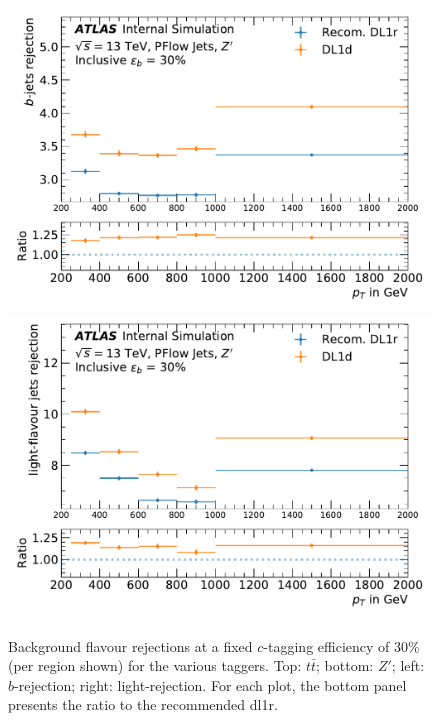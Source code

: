\begin{center}
\begin{figure}[h!]
\centerline{
\includegraphics[scale=0.425]{Images//FTAG/Reprocessed/plotting_eff_vs_pt_c/pT_vs_beff_c_zp_299.pdf}
\includegraphics[scale=0.425]{Images//FTAG/Reprocessed/plotting_eff_vs_pt_c/pT_vs_beff_u_zp_299.pdf}
}
\caption{Background flavour rejections at a fixed $c$-tagging efficiency of 30\% (per region shown) for the various taggers. Top: $t\bar{t}$; bottom: $Z'$; left: $b$-rejection; right: light-rejection. For each plot, the bottom panel presents the ratio to the recommended \gls{dl1r}.}
\label{fig:pt\gls{dl1d}z}
\end{figure}
\end{center}

